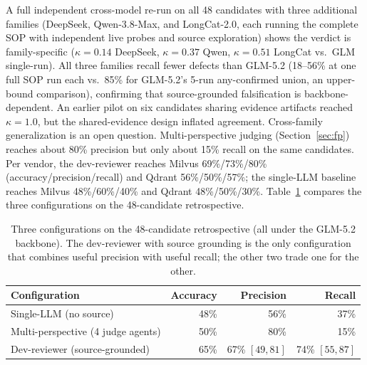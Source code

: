 \documentclass[sigconf]{acmart}
\begin{document}
A full independent cross-model re-run on all 48 candidates with three additional families (DeepSeek, Qwen-3.8-Max, and LongCat-2.0, each running the complete SOP with independent live probes and source exploration) shows the verdict is family-specific ($\kappa = 0.14$ DeepSeek, $\kappa = 0.37$ Qwen, $\kappa = 0.51$ LongCat vs.\ GLM single-run). All three families recall fewer defects than GLM-5.2 (18--56\% at one full SOP run each vs.\ 85\% for GLM-5.2's 5-run any-confirmed union, an upper-bound comparison), confirming that source-grounded falsification is backbone-dependent. An earlier pilot on six candidates sharing evidence artifacts reached $\kappa = 1.0$, but the shared-evidence design inflated agreement. Cross-family generalization is an open question. Multi-perspective judging (Section~\ref{sec:fp}) reaches about 80\% precision but only about 15\% recall on the same candidates. Per vendor, the dev-reviewer reaches Milvus 69\%/73\%/80\% (accuracy/precision/recall) and Qdrant 56\%/50\%/57\%; the single-LLM baseline reaches Milvus 48\%/60\%/40\% and Qdrant 48\%/50\%/30\%. Table~\ref{tab:configs} compares the three configurations on the 48-candidate retrospective.

\begin{table}[t]
\caption{Three configurations on the 48-candidate retrospective (all under the GLM-5.2 backbone). The dev-reviewer with source grounding is the only configuration that combines useful precision with useful recall; the other two trade one for the other.}
\label{tab:configs}
\small
\begin{tabular}{@{}lrrr@{}}
\toprule
Configuration & Accuracy & Precision & Recall \\
\midrule
Single-LLM (no source) & 48\% & 56\% & 37\% \\
Multi-perspective (4 judge agents) & 50\% & 80\% & 15\% \\
Dev-reviewer (source-grounded) & 65\% & 67\% $[49, 81]$ & 74\% $[55, 87]$ \\
\bottomrule
\end{tabular}
\end{table}
\end{document}
